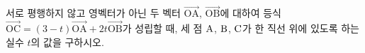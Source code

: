 서로 평행하지 않고 영벡터가 아닌 두 벡터 $\overrightarrow{\mathrm{OA}}$, $\overrightarrow{\mathrm{OB}}$에 대하여 등식 $\overrightarrow{\mathrm{OC}}=(3-t)\overrightarrow{\mathrm{OA}}+2t\overrightarrow{\mathrm{OB}}$가 성립할 때, 세 점 $\mathrm{A}$, $\mathrm{B}$, $\mathrm{C}$가 한 직선 위에 있도록 하는 실수 $t$의 값을 구하시오.
